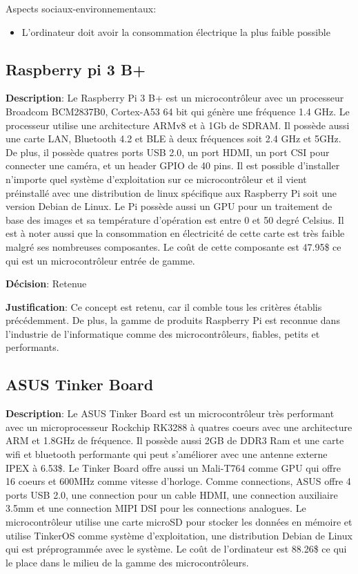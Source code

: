 Aspects sociaux-environnementaux:
\begin{itemize}
	\item L’ordinateur doit avoir la consommation électrique la plus faible possible
\end{itemize}

\subsection{Raspberry pi 3 B+}

\textbf{Description}: Le Raspberry Pi 3 B+ est un microcontrôleur avec un processeur Broadcom BCM2837B0, Cortex-A53 64 bit qui génère une fréquence 1.4 GHz. Le processeur utilise une architecture ARMv8 et à 1Gb de SDRAM. Il possède aussi une carte LAN, Bluetooth 4.2 et BLE à deux fréquences soit 2.4 GHz et 5GHz. De plus, il possède quatres ports USB 2.0, un port HDMI, un port CSI pour connecter une caméra,  et un header GPIO de 40 pins. Il est possible d’installer n’importe quel système d’exploitation sur ce microcontrôleur et il vient préinstallé avec une distribution de linux spécifique aux Raspberry Pi soit une version Debian de Linux. Le Pi possède aussi un GPU pour un traitement de base des images et sa température d’opération est entre 0 et 50 degré Celsius. Il est à noter aussi que la consommation en électricité de cette carte est très faible malgré ses nombreuses composantes. Le coût de cette composante est 47.95\$ ce qui est un microcontrôleur entrée de gamme.

\textbf{Décision}: Retenue

\textbf{Justification}: Ce concept est retenu, car il comble tous les critères établis précédemment. De plus, la gamme de produits Raspberry Pi est reconnue dans l’industrie de l’informatique comme des microcontrôleurs, fiables, petits et performants.


\subsection {ASUS Tinker Board}

\textbf{Description}: Le ASUS Tinker Board est un microcontrôleur très performant avec un microprocesseur Rockchip RK3288 à quatres coeurs avec une architecture ARM et 1.8GHz de fréquence. Il possède aussi 2GB de DDR3 Ram et une carte wifi et bluetooth performante qui peut s’améliorer avec une antenne externe IPEX à 6.53\$. Le Tinker Board offre aussi un Mali-T764 comme GPU qui offre 16 coeurs et 600MHz comme vitesse d’horloge. Comme connections, ASUS offre 4 ports USB 2.0, une connection pour un cable HDMI, une connection auxiliaire 3.5mm et une connection MIPI DSI pour les connections analogues. Le microcontrôleur utilise une carte microSD pour stocker les données en mémoire et utilise TinkerOS comme système d’exploitation, une distribution Debian de Linux qui est préprogrammée avec le système. Le coût de l’ordinateur est 88.26\$ ce qui le place dans le milieu de la gamme des microcontrôleurs.

